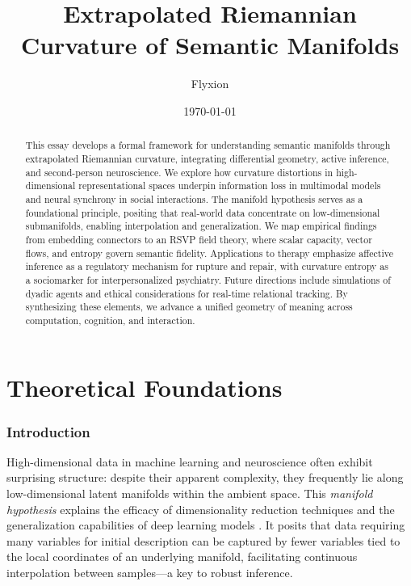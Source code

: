 \documentclass{article}
\title{Extrapolated Riemannian Curvature of Semantic Manifolds}
\author{Flyxion}
\date{\today}
\theoremstyle{definition}
\begin{document}
\maketitle

\begin{abstract}
This essay develops a formal framework for understanding semantic manifolds through extrapolated Riemannian curvature, integrating differential geometry, active inference, and second-person neuroscience. We explore how curvature distortions in high-dimensional representational spaces underpin information loss in multimodal models and neural synchrony in social interactions. The manifold hypothesis serves as a foundational principle, positing that real-world data concentrate on low-dimensional submanifolds, enabling interpolation and generalization. We map empirical findings from embedding connectors to an RSVP field theory, where scalar capacity, vector flows, and entropy govern semantic fidelity. Applications to therapy emphasize affective inference as a regulatory mechanism for rupture and repair, with curvature entropy as a sociomarker for interpersonalized psychiatry. Future directions include simulations of dyadic agents and ethical considerations for real-time relational tracking. By synthesizing these elements, we advance a unified geometry of meaning across computation, cognition, and interaction.
\end{abstract}

\tableofcontents

\part{Theoretical Foundations}

\section{Introduction}

High-dimensional data in machine learning and neuroscience often exhibit surprising structure: despite their apparent complexity, they frequently lie along low-dimensional latent manifolds within the ambient space. This \emph{manifold hypothesis} \cite{fefferman2016testing,gorban2018blessing,olah2014blog,cayton2005algorithms} explains the efficacy of dimensionality reduction techniques and the generalization capabilities of deep learning models \cite{chollet2021deep}. It posits that data requiring many variables for initial description can be captured by fewer variables tied to the local coordinates of an underlying manifold, facilitating continuous interpolation between samples—a key to robust inference.
\end{document}
